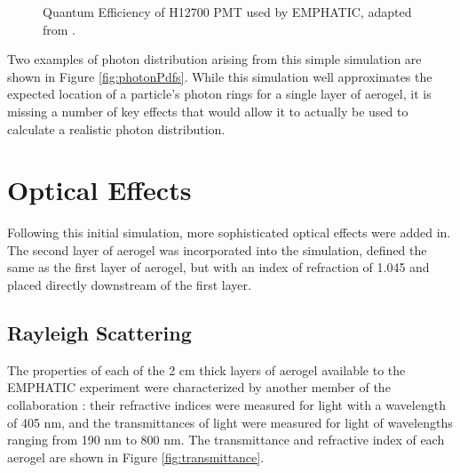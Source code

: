 \begin{figure}[]
\centering
{}
\caption[Quantum efficiency of H12700 PMT used by EMPHATIC.]{Quantum Efficiency of H12700 PMT used by EMPHATIC, adapted from \cite{H12700}.}
\label{fig:qEff} 
\end{figure}

Two examples of photon distribution arising from this simple simulation are shown in Figure \ref{fig:photonPdfs}. While this simulation well approximates the expected location of a particle's photon rings for a single layer of aerogel, it is missing a number of key effects that would allow it to actually be used to calculate a realistic photon distribution.

\section{Optical Effects}
Following this initial simulation, more sophisticated optical effects were added in. The second layer of aerogel was incorporated into the simulation, defined the same as the first layer of aerogel, but with an index of refraction of 1.045 and placed directly downstream of the first layer.

\subsection{Rayleigh Scattering}
The properties of each of the 2 cm thick layers of aerogel available to the EMPHATIC experiment were characterized by another member of the collaboration \cite{aerogelTabata}: their refractive indices were measured for light with a wavelength of 405 nm, and the transmittances of light were measured for light of wavelengths ranging from 190 nm to 800 nm.
The transmittance and refractive index of each aerogel are shown in Figure \ref{fig:transmittance}.


